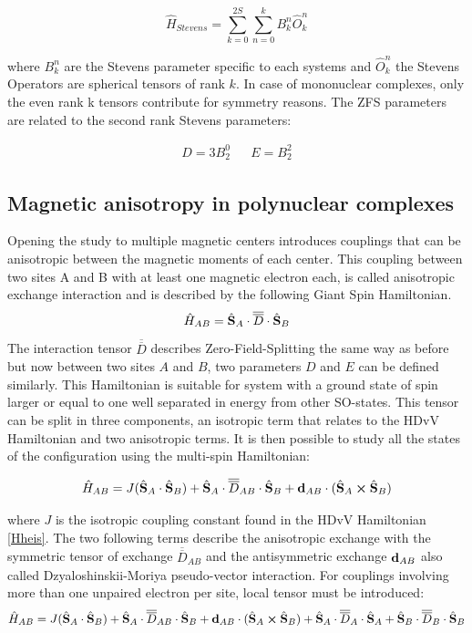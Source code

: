 \documentclass[12pt]{report}
\numberwithin{equation}{section}
\begin{document}
\begin{equation}
    \hat{H}_{Stevens}=\sum_{k=0}^{2S}\sum_{n=0}^{k}B_k^n\hat{O}_k^n
\end{equation}

where $B_k^n$ are the Stevens parameter specific to each systems and $\hat{O}_k^n$ the Stevens Operators are spherical tensors of rank $k$.
In case of mononuclear complexes, only the even rank k tensors contribute for symmetry reasons. 
The ZFS parameters are related to the second rank Stevens parameters:

\begin{align}
    D=3B_2^0 && E=B_2^2
\end{align}


\subsection{Magnetic anisotropy in polynuclear complexes}
Opening the study to multiple magnetic centers introduces couplings that can be anisotropic between the magnetic moments of each center. 
This coupling between two sites A and B with at least one magnetic electron each, is called anisotropic exchange interaction and is described by the following Giant Spin Hamiltonian.
\begin{equation}
    \hat{H}_{AB}=\hat{\vb S}_A\cdot \overline{\overline{D}} \cdot \hat{\vb S}_B
\end{equation}
The interaction tensor $\overline{\overline{D}}$ describes Zero-Field-Splitting the same way as before but now between two sites $A$ and $B$, two parameters $D$ and $E$ can be defined similarly. 
This Hamiltonian is suitable for system with a ground state of spin larger or equal to one well separated in energy from other SO-states.
This tensor can be split in three components, an isotropic term that relates to the HDvV Hamiltonian and two anisotropic terms.
It is then possible to study all the states of the configuration using the multi-spin Hamiltonian:

\begin{equation}
    \hat{H}_{AB}=J(\hat{\vb S}_A \cdot \hat{\vb S}_B) + \hat{\vb S}_A \cdot\overline{\overline{D}}_{AB} \cdot \hat{\vb S}_B + \vb{d}_{AB} \cdot (\hat{\vb S}_A \cross \hat{\vb S}_B)
\end{equation}

\noindent where $J$ is the isotropic coupling constant found in the HDvV Hamiltonian \ref{Hheis}.
The two following terms describe the anisotropic exchange with the symmetric tensor of exchange $\overline{\overline{D}}_{AB}$ and the antisymmetric exchange $\vb{d}_{AB}$ also called Dzyaloshinskii-Moriya pseudo-vector interaction.
For couplings involving more than one unpaired electron per site, local tensor must be introduced:
\begin{equation}\label{HMS}
    \hat{H}_{AB}=J(\hat{\vb S}_A \cdot \hat{\vb S}_B) + \hat{\vb S}_A \cdot\overline{\overline{D}}_{AB} \cdot \hat{\vb S}_B + \vb{d}_{AB} \cdot (\hat{\vb S}_A \cross \hat{\vb S}_B) +\hat{\vb S}_A \cdot\overline{\overline{D}}_{A} \cdot \hat{\vb S}_A +\hat{\vb S}_B \cdot\overline{\overline{D}}_{B} \cdot \hat{\vb S}_B
\end{equation}
\end{document}
